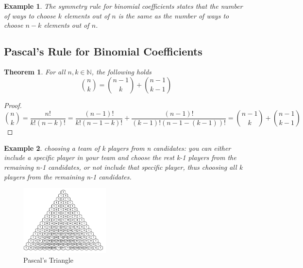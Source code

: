 \documentclass[11pt]{book} %
\newtheorem{theorem}{Theorem}[section]
\newtheorem*{example*}{Example}
\begin{document}
\begin{example*}
    The symmetry rule for binomial coefficients states that the number of ways to choose $k$ elements out of $n$ is the same as the number of ways to choose $n-k$ elements out of $n$.
\end{example*}


\subsection{Pascal's Rule for Binomial Coefficients}

\begin{boxA}
    \begin{theorem}
        For all $n, k \in \mathbb{N}$, the following holds
        \begin{equation}
            \binom{n}{k} = \binom{n-1}{k} + \binom{n-1}{k-1}
        \end{equation}
    \end{theorem}
\end{boxA}

\begin{proof}
    \begin{equation}
        \binom{n}{k} = \frac{n!}{k!(n-k)!} = \frac{(n-1)!}{k!(n-1-k)!} + \frac{(n-1)!}{(k-1)!(n-1-(k-1))!} = \binom{n-1}{k} + \binom{n-1}{k-1}
    \end{equation}
\end{proof}

\begin{example*}
    choosing a team of k players from n candidates: you can either include a specific player in your team and choose the rest 
    k-1 players from the remaining n-1 candidates, or not include that specific player, thus choosing all k players from the remaining n-1 candidates.
\end{example*}

\begin{figure}[H]
    \centering
    \includegraphics[width=0.4\textwidth]{figs/pascals_triangle.jpeg}
    \caption{Pascal's Triangle}
\end{figure}
\end{document}
